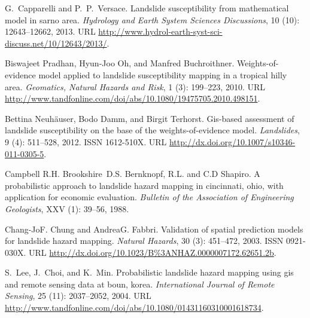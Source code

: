\documentclass[11pt,twoside]{rmta2010esp}%
\begin{document}
\begin{thebibliography}{99}
G.~Capparelli and P.~P.~Versace.
\newblock Landslide susceptibility from mathematical model in sarno area.
\newblock \emph{Hydrology and Earth System Sciences Discussions}, 10
  (10): 12643--12662, 2013.
\newblock URL
  \url{http://www.hydrol-earth-syst-sci-discuss.net/10/12643/2013/}.


Biswajeet Pradhan, Hyun-Joo Oh, and Manfred Buchroithner.
\newblock Weights-of-evidence model applied to landslide susceptibility mapping
  in a tropical hilly area.
\newblock \emph{Geomatics, Natural Hazards and Risk}, 1 (3):
  199--223, 2010.
\newblock URL
  \url{http://www.tandfonline.com/doi/abs/10.1080/19475705.2010.498151}.
  
  
Bettina Neuhäuser, Bodo Damm, and Birgit Terhorst.
\newblock Gis-based assessment of landslide susceptibility on the base of the
  weights-of-evidence model.
\newblock \emph{Landslides}, 9 (4): 511--528, 2012.
\newblock ISSN 1612-510X.
\newblock URL \url{http://dx.doi.org/10.1007/s10346-011-0305-5}.



Campbell R.H. Brookshire~D.S. Bernknopf, R.L. and C.D Shapiro.
\newblock A probabilistic approach to landslide hazard mapping in cincinnati,
  ohio, with application for economic evaluation.
\newblock \emph{Bulletin of the Association of Engineering Geologists},
  XXV (1): 39--56, 1988.
  
  
Chang-JoF. Chung and AndreaG. Fabbri.
\newblock Validation of spatial prediction models for landslide hazard mapping.
\newblock \emph{Natural Hazards}, 30 (3): 451--472, 2003.
\newblock ISSN 0921-030X.
\newblock URL \url{http://dx.doi.org/10.1023/B\%3ANHAZ.0000007172.62651.2b}.  

S.~Lee, J.~Choi, and K.~Min.
\newblock Probabilistic landslide hazard mapping using gis and remote sensing
  data at boun, korea.
\newblock \emph{International Journal of Remote Sensing}, 25
  (11): 2037--2052, 2004.
\newblock URL
  \url{http://www.tandfonline.com/doi/abs/10.1080/01431160310001618734}.
  

\end{thebibliography}
\end{document}
